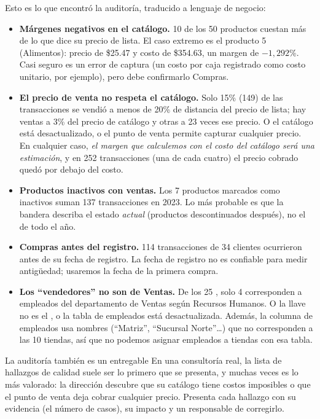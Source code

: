 Esto es lo que encontró la auditoría, traducido a lenguaje de negocio:

\begin{itemize}
  \item \textbf{Márgenes negativos en el catálogo.} 10 de los 50 productos
        cuestan más de lo que dice su precio de lista. El caso extremo es el
        producto 5 (Alimentos): precio de \$25.47 y costo de \$354.63, un
        margen de $-1{,}292$\%. Casi seguro es un error de captura (un costo
        por caja registrado como costo unitario, por ejemplo), pero debe
        confirmarlo Compras.
  \item \textbf{El precio de venta no respeta el catálogo.} Solo
        15\% (149) de las transacciones se vendió a menos de 20\% de
        distancia del precio de lista; hay ventas a 3\% del precio de
        catálogo y otras a 23 veces ese precio. O el catálogo está
        desactualizado, o el punto de venta permite capturar cualquier
        precio. En cualquier caso, \emph{el margen que calculemos con el
        costo del catálogo será una estimación}, y en 252 transacciones
        (una de cada cuatro) el precio cobrado quedó por debajo del costo.
  \item \textbf{Productos inactivos con ventas.} Los 7 productos marcados
        como inactivos suman 137 transacciones en 2023. Lo más probable es
        que la bandera  describa el estado \emph{actual}
        (productos descontinuados después), no el de todo el año.
  \item \textbf{Compras antes del registro.} 114 transacciones de 34 clientes
        ocurrieron antes de su fecha de registro. La fecha de registro no es
        confiable para medir antigüedad; usaremos la fecha de la primera
        compra.
  \item \textbf{Los ``vendedores'' no son de Ventas.} De los 25
        , solo 4 corresponden a empleados del
        departamento de Ventas según Recursos Humanos. O la llave
         no es el , o la tabla de
        empleados está desactualizada. Además, la columna 
        de empleados usa nombres (``Matriz'', ``Sucursal Norte''\ldots) que
        no corresponden a las 10 tiendas, así que no podemos asignar
        empleados a tiendas con esa tabla.
\end{itemize}

\begin{negocio}{La auditoría también es un entregable}
En una consultoría real, la lista de hallazgos de calidad suele ser lo
primero que se presenta, y muchas veces es lo más valorado: la dirección
descubre que su catálogo tiene costos imposibles o que el punto de venta
deja cobrar cualquier precio. Presenta cada hallazgo con su evidencia (el
número de casos), su impacto y un responsable de corregirlo.
\end{negocio}

